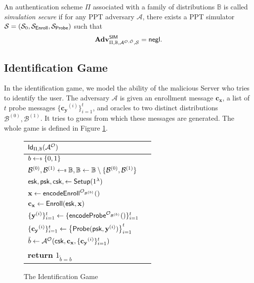An authentication scheme $\Pi$ associated with a family of distributions $\mathbb{B}$ is called \emph{simulation secure} if for any PPT adversary $\mathcal{A}$, there exists a PPT simulator $\mathcal{S} = (\mathcal{S}_0, \mathcal{S}_{\sf Enroll}, \mathcal{S}_{\sf Probe})$ such that
\[
	\mathbf{Adv}^{\sf SIM}_{\Pi, \mathbb{B}, \mathcal{A}^{\mathcal{O}, \tilde{\mathcal{O}}}, \mathcal{S}} = \mathsf{negl}.
\]


\subsection{Identification Game}
\label{sec:id_game}

In the identification game, we model the ability of the malicious {\sf Server} who tries to identify the user. The adversary $\mathcal{A}$ is given an enrollment message $\mathbf{c_x}$, a list of $t$ probe messages $\{ \mathbf{c_y}^{(i)} \}_{i=1}^t$, and oracles to two distinct distributions $\mathcal{B}^{(0)}, \mathcal{B}^{(1)}$. It tries to guess from which these messages are generated. The whole game is defined in Figure \ref{fig:id_game}.

\begin{figure}[h]
	\begin{center}
	\begin{tabular}{l c}
		${\sf Id}_{\Pi, \mathbb{B}}(\mathcal{A}^\mathcal{O})$\\

			\hline

			$b \getsdollar \{0, 1\}$ \\

			$\mathcal{B}^{(0)}, \mathcal{B}^{(1)} \getsdollar \mathbb{B}, \mathbb{B} \gets \mathbb{B} \setminus \{ \mathcal{B}^{(0)}, \mathcal{B}^{(1)} \}$ \\

			${\sf esk}, {\sf psk}, {\sf csk}, \gets {\sf Setup}(1^\lambda)$ \\

			$\mathbf{x} \gets {\sf encodeEnroll}^{\mathcal{O}_{\mathcal{B}^{(b)}}}()$ \\

			$\mathbf{c_x} \gets {\sf Enroll}({\sf esk}, \mathbf{x})$ \\

			$\{\mathbf{y}^{(i)}\}_{i=1}^t \gets \{ {\sf encodeProbe}^{\mathcal{O}_{\mathcal{B}^{(b)}}}() \}_{i=1}^t $ \\
			
			$\{ \mathbf{c_y}^{(i)} \}_{i=1}^t \gets \left\{ {\sf Probe}( {\sf psk}, \mathbf{y}^{(i)} ) \right \}_{i=1}^t$ \\

			$\tilde{b} \gets \mathcal{A}^\mathcal{O} ( {\sf csk}, \mathbf{c_x}, \{ \mathbf{c_y}^{(i)} \}_{i=1}^t )$ \\

			\textbf{return} $1_{\tilde{b} = b}$
			
	\end{tabular}
	\end{center}
	\caption{The Identification Game}
	\label{fig:id_game}
\end{figure}



